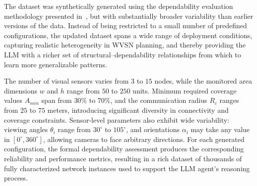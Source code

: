 





The dataset was synthetically generated using the dependability evaluation methodology presented in~\cite{DepML2025}, but with substantially broader variability than earlier versions of the data. Instead of being restricted to a small number of predefined configurations, the updated dataset spans a wide range of deployment conditions, capturing realistic heterogeneity in WVSN planning, and thereby providing the LLM with a richer set of structural–dependability relationships from which to learn more generalizable patterns.

The number of visual sensors varies from $3$ to $15$ nodes, while the monitored area dimensions $w$ and $h$ range from $50$ to $250$ units. Minimum required coverage values $A_{min}$ span from $30\%$ to $70\%$, and the communication radius $R_c$ ranges from $25$ to $75$ meters, introducing significant diversity in connectivity and coverage constraints. Sensor-level parameters also exhibit wide variability: viewing angles $\theta_i$ range from $30^\circ$ to $105^\circ$, and orientations $\alpha_i$ may take any value in $[0^\circ,360^\circ]$, allowing cameras to face arbitrary directions. For each generated configuration, the formal dependability assessment produces the corresponding reliability and performance metrics, resulting in a rich dataset of thousands of fully characterized network instances used to support the LLM agent's reasoning process.


